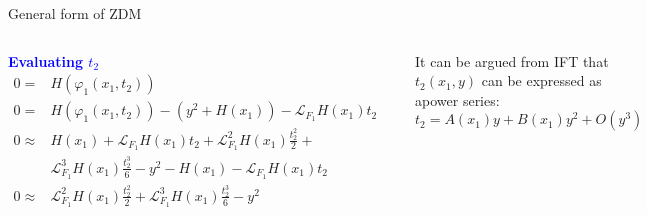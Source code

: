 \documentclass[xcolor=x11names,compress]{beamer}
\renewcommand{\(}{\begin{columns}}
\renewcommand{\)}{\end{columns}}
\newcommand{\<}[1]{\begin{column}{#1}}
\renewcommand{\>}{\end{column}}
\newcommand{\hlb}[1]{\textbf{\textcolor{blue}{#1}}}
\newcommand{\lien}[2]{\mathcal{L}_{#1}^{#2}}
\newcommand{\lie}[1]{\mathcal{L}_{#1}}
\begin{document}
\begin{frame}{General form of ZDM}
\begin{columns}[c]
\hlb{Evaluating $t_2$}
\begin{align*}
0=&H(\varphi_1(x_1,t_2))\\
0=&H(\varphi_1(x_1,t_2))-(y^2+H(x_1))-\lie{F_1}H(x_1)t_2&\\
0\approx&H(x_1)+\lie{F_1}H(x_1)t_2+\lien{F_1}{2}H(x_1)\frac{t_2^2}{2}+\\&\lien{F_1}{3}H(x_1)\frac{t_2^3}{6}-y^2-H(x_1)-\lie{F_1}H(x_1)t_2\\
0\approx&\lien{F_1}{2}H(x_1)\frac{t_2^2}{2}+\lien{F_1}{3}H(x_1)\frac{t_2^3}{6}-y^2
\end{align*}

It can be argued from IFT that $t_2(x_1,y)$ can be expressed as apower series:
\[
t_2=A(x_1)y+B(x_1)y^2+O(y^3)
\]
\begin{center}
\includegraphics[width=\textwidth]{ZDM}
\end{center}
\end{columns}
\end{frame}
\end{document}
